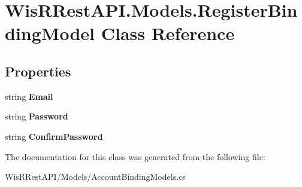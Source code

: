 \hypertarget{class_wis_r_rest_a_p_i_1_1_models_1_1_register_binding_model}{}\section{Wis\+R\+Rest\+A\+P\+I.\+Models.\+Register\+Binding\+Model Class Reference}
\label{class_wis_r_rest_a_p_i_1_1_models_1_1_register_binding_model}
\subsection*{Properties}
\begin{DoxyCompactItemize}
\item 
\hypertarget{class_wis_r_rest_a_p_i_1_1_models_1_1_register_binding_model_ab877510048c1c539566bc0bbf36e5269}{}string {\bfseries Email}\label{class_wis_r_rest_a_p_i_1_1_models_1_1_register_binding_model_ab877510048c1c539566bc0bbf36e5269}

\item 
\hypertarget{class_wis_r_rest_a_p_i_1_1_models_1_1_register_binding_model_addd34011700718552418a0d49b09151b}{}string {\bfseries Password}\label{class_wis_r_rest_a_p_i_1_1_models_1_1_register_binding_model_addd34011700718552418a0d49b09151b}

\item 
\hypertarget{class_wis_r_rest_a_p_i_1_1_models_1_1_register_binding_model_a04828803ee71ae39b6fdeb6b4ca39f97}{}string {\bfseries Confirm\+Password}\label{class_wis_r_rest_a_p_i_1_1_models_1_1_register_binding_model_a04828803ee71ae39b6fdeb6b4ca39f97}

\end{DoxyCompactItemize}


The documentation for this class was generated from the following file\+:\begin{DoxyCompactItemize}
\item 
Wis\+R\+Rest\+A\+P\+I/\+Models/Account\+Binding\+Models.\+cs\end{DoxyCompactItemize}
